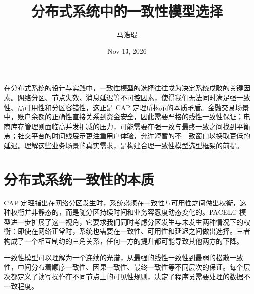 \title{分布式系统中的一致性模型选择}
\author{马浩琨}
\date{Nov 13, 2026}
\maketitle
在分布式系统的设计与实践中，一致性模型的选择往往成为决定系统成败的关键因素。网络分区、节点失效、消息延迟等不可控因素，使得我们无法同时满足强一致性、高可用性和分区容错性，这正是 CAP 定理所揭示的本质矛盾。金融交易场景中，账户余额的正确性直接关系到资金安全，因此需要严格的线性一致性保证；电商库存管理则面临高并发扣减的压力，可能需要在强一致与最终一致之间找到平衡点；社交平台的时间线展示更注重用户体验，允许短暂的不一致窗口以换取更低的延迟。理解这些业务场景的真实需求，是构建合理一致性模型选型框架的前提。\par
\chapter{分布式系统一致性的本质}
CAP 定理指出在网络分区发生时，系统必须在一致性与可用性之间做出权衡，这种权衡并非静态的，而是随分区持续时间和业务容忍度动态变化的。PACELC 模型进一步扩展了这一视角，它要求我们同时考虑分区发生与未发生两种情况下的权衡：即使在网络正常时，系统也需要在一致性、可用性和延迟之间做出选择。三者构成了一个相互制约的三角关系，任何一方的提升都可能导致其他两方的下降。\par
一致性模型可以理解为一个连续的光谱，从最强的线性一致性到最弱的松散一致性，中间分布着顺序一致性、因果一致性、最终一致性等不同层次的保证。每个层次都定义了读写操作在不同节点上的可见性规则，决定了程序员需要处理的数据不一致程度。\par
